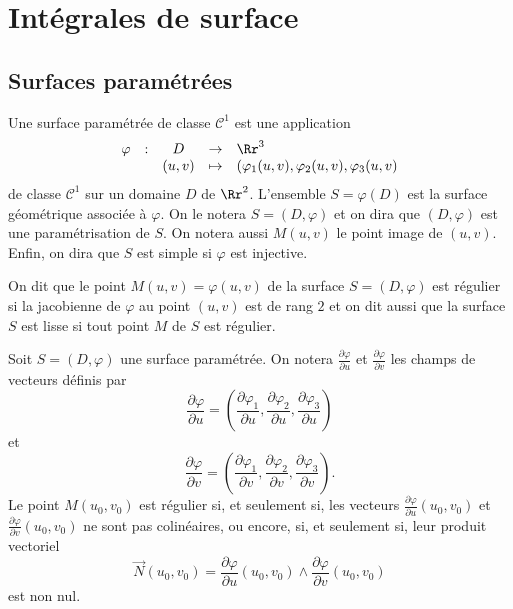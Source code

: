 \documentclass[class=report,crop=false]{standalone}
\begin{document}
\vskip8mm

\section{Intégrales de surface}
\subsection{Surfaces paramétrées}

\vskip4mm

\begin{definition}Une surface paramétrée de classe $\mathscr{C}^1$ est une application 
$$\begin{array}{ccccl}\varphi &:&D&\to &\Rr^3\\ &&(u,v)&\mapsto &(\varphi _1(u,v),\varphi _2(u,v),\varphi _3(u,v)\end{array}$$
de classe $\mathscr{C}^1$ sur un domaine $D$ de $\Rr^2$. L'ensemble $S=\varphi (D)$ est la surface géométrique associée à $\varphi $. On le notera $S=(D,\varphi)$ et on dira que $\left(D,\varphi\right)$ est une paramétrisation de $S$. On notera aussi $M(u,v)$ le point image de $(u,v)$. Enfin, on dira que $S$ est simple si $\varphi$ est injective.
\end{definition}

\vskip4mm

\begin{definition}On dit que le point $M(u,v)=\varphi (u,v)$ de la surface $S=(D,\varphi)$ est régulier si la jacobienne de $\varphi$ au point $(u,v)$ est de rang $2$ et on dit aussi que la surface $S$ est lisse si tout point $M$ de $S$ est régulier.
\end{definition}

\vskip4mm

\noindent Soit $S=(D,\varphi)$ une surface paramétrée. On notera $\displaystyle \frac{\partial \varphi}{\partial u}$ et $\displaystyle \frac{\partial \varphi}{\partial v}$ les champs de vecteurs définis par
$$\displaystyle \frac{\partial \varphi}{\partial u}=\left(\frac{\partial \varphi _1}{\partial u},\frac{\partial \varphi _2}{\partial u},\frac{\partial \varphi _3}{\partial u}\right)$$
et
$$\displaystyle \frac{\partial \varphi}{\partial v}=\left(\frac{\partial \varphi _1}{\partial v},\frac{\partial \varphi _2}{\partial v},\frac{\partial \varphi _3}{\partial v}\right).$$
Le point $M(u_0,v_0)$ est régulier si, et seulement si, les vecteurs $\displaystyle \frac{\partial \varphi}{\partial u}(u_0,v_0)$ et $\displaystyle \frac{\partial \varphi}{\partial v}(u_0,v_0)$ ne sont pas colinéaires, ou encore, si, et seulement si, leur produit vectoriel
$$\overrightarrow{N}(u_0,v_0)=\frac{\partial \varphi}{\partial u}(u_0,v_0)\wedge \frac{\partial \varphi}{\partial v}(u_0,v_0)$$
est non nul.
\end{document}
